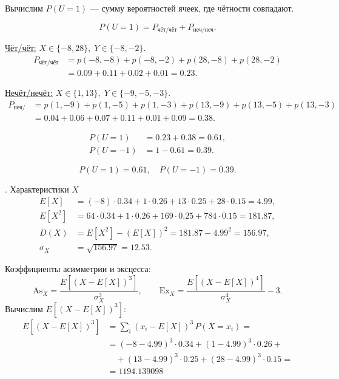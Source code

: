 \documentclass[a4paper,14pt]{extarticle}
\begin{document}
        Вычислим $P(U=1)$ — сумму вероятностей ячеек, где чётности совпадают.

        \[
        P(U=1) = P_{\text{чёт/чёт}} + P_{\text{неч/неч}}.
        \]

        \noindent\underline{Чёт/чёт:} $X \in \{-8, 28\}, \; Y \in \{-8, -2\}$.
        \[
        \begin{aligned}
        P_{\text{чёт/чёт}} &= p(-8,-8) + p(-8,-2) + p(28,-8) + p(28,-2) \\
        &= 0.09 + 0.11 + 0.02 + 0.01 = 0.23.
        \end{aligned}
        \]

        \noindent\underline{Нечёт/нечёт:} $X \in \{1, 13\}, \; Y \in \{-9, -5, -3\}$.
        \[
        \begin{aligned}
        P_{\text{неч/неч}} &= p(1,-9) + p(1,-5) + p(1,-3) + p(13,-9) + p(13,-5) + p(13,-3) \\
        &= 0.04 + 0.06 + 0.07 + 0.11 + 0.01 + 0.09 = 0.38.
        \end{aligned}
        \]

        \[
        \begin{aligned}
        P(U=1) &= 0.23 + 0.38 = 0.61,\\
        P(U=-1) &= 1 - 0.61 = 0.39.
        \end{aligned}
        \]

        \[
        \boxed{P(U=1)=0.61, \quad P(U=-1)=0.39.}
        \]


        . Характеристики $X$
        \[
        \begin{aligned}
        E[X] &= (-8)\cdot0.34 + 1\cdot0.26 + 13\cdot0.25 + 28\cdot0.15 = 4.99, \\
        E[X^2] &= 64\cdot0.34 + 1\cdot0.26 + 169\cdot0.25 + 784\cdot0.15 = 181.87, \\
        D(X) &= E[X^2] - (E[X])^2 = 181.87 - 4.99^2 = 156.97, \\
        \sigma_X &= \sqrt{156.97} = 12.53.
        \end{aligned}
        \]

        Коэффициенты асимметрии и эксцесса:
        \[
        \mathrm{As}_X = \frac{E[(X - E[X])^3]}{\sigma_X^3}, 
        \qquad
        \mathrm{Ex}_X = \frac{E[(X - E[X])^4]}{\sigma_X^4} - 3.
        \]
        Вычислим $E[(X - E[X])^3]$:
        \[
        \begin{aligned}
        E[(X - E[X])^3] &= \sum_i (x_i - E[X])^3 \, P(X=x_i) = \\
        &= (-8 - 4.99)^3 \cdot 0.34 + (1 - 4.99)^3 \cdot 0.26 + \\
        &\quad + (13 - 4.99)^3 \cdot 0.25 + (28 - 4.99)^3 \cdot 0.15 = \\
        &= 1194.139098
        \end{aligned}
        \]
\end{document}
